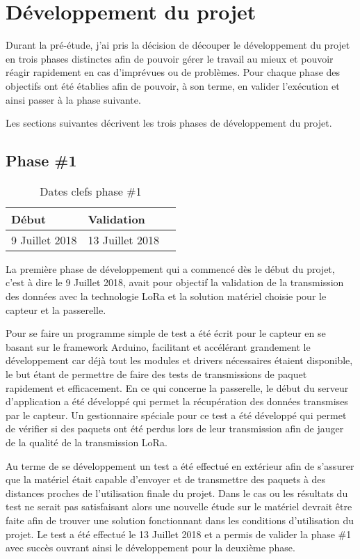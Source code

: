 
\chapter{Développement du projet}\label{ch:developpement}

Durant la pré-étude, j'ai pris la décision de découper le développement du projet en trois phases distinctes afin de pouvoir gérer le travail au mieux et pouvoir réagir rapidement en cas d'imprévues ou de problèmes. Pour chaque phase des objectifs ont été établies afin de pouvoir, à son terme, en valider l'exécution et ainsi passer à la phase suivante.

Les sections suivantes décrivent les trois phases de développement du projet.

\section{Phase \#1}

\begin{table}[htb]
\caption{Dates clefs phase \#1}
\label{tab:detail_phase_1}
\centering
\begin{tabular}{ l l l }
\toprule
Début & Validation \\
\midrule
9 Juillet 2018 & 13 Juillet 2018  \\
\bottomrule 
\end{tabular}
\end{table}

La première phase de développement qui a commencé dès le début du projet, c'est à dire le 9 Juillet 2018, avait pour objectif la validation de la transmission des données avec la technologie LoRa et la solution matériel choisie pour le capteur et la passerelle.

Pour se faire un programme simple de test a été écrit pour le capteur en se basant sur le framework Arduino, facilitant et accélérant grandement le développement car déjà tout les modules et drivers nécessaires étaient disponible, le but étant de permettre de faire des tests de transmissions de paquet rapidement et efficacement. En ce qui concerne la passerelle, le début du serveur d'application a été développé qui permet la récupération des données transmises par le capteur. Un gestionnaire spéciale pour ce test a été développé qui permet de vérifier si des paquets ont été perdus lors de leur transmission afin de jauger de la qualité de la transmission LoRa.

Au terme de se développement un test a été effectué en extérieur afin de s'assurer que la matériel était capable d'envoyer et de transmettre des paquets à des distances proches de l'utilisation finale du projet. Dans le cas ou les résultats du test ne serait pas satisfaisant alors une nouvelle étude sur le matériel devrait être faite afin de trouver une solution fonctionnant dans les conditions d'utilisation du projet. Le test a été effectué le 13 Juillet 2018 et a permis de valider la phase \#1 avec succès ouvrant ainsi le développement pour la deuxième phase.

